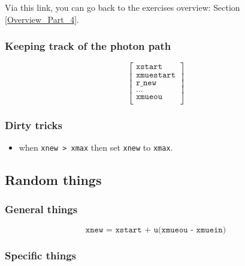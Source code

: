 \documentclass[../main/main.tex]{subfiles}
\begin{document}
\vspace{0.7cm}
Via this link, you can go back to the exercises overview: Section \underline{\ref{Overview_Part_4}}.

\subsubsection{Keeping track of the photon path}
\begin{equation}
\left[
\begin{matrix}
\texttt{xstart} \\
\texttt{xmuestart} \\
\texttt{r\_new} \\
\hdots \\
\texttt{xmueou} \\
\end{matrix}
\right]
\end{equation}

\subsubsection{Dirty tricks}
\begin{itemize}
\item when \texttt{xnew > xmax} then set \texttt{xnew} to \texttt{xmax}.
\end{itemize}

\newpage
\subsection{Random things}

\subsubsection{General things}
\begin{equation}
\texttt{xnew = xstart + u(xmueou - xmuein)}
\label{xnew_vx_xstart}
\end{equation}

\subsubsection{Specific things}
\end{document}
